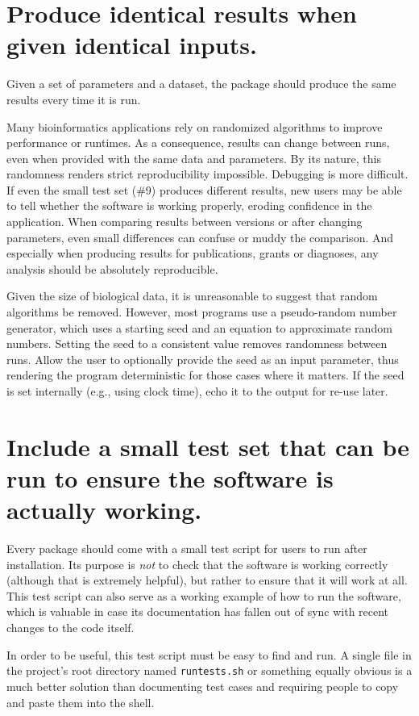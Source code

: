 \documentclass[10pt]{article}
\begin{document}
\section{Produce identical results when given identical inputs.}

Given a set of parameters and a dataset, the package should produce the
same results every time it is run.

Many bioinformatics applications rely on randomized algorithms to
improve performance or runtimes. As a consequence, results can change
between runs, even when provided with the same data and parameters. By
its nature, this randomness renders strict reproducibility impossible.
Debugging is more difficult. If even the small test set (\#9) produces
different results, new users may be able to tell whether the software is
working properly, eroding confidence in the application. When comparing
results between versions or after changing parameters, even small
differences can confuse or muddy the comparison. And especially when
producing results for publications, grants or diagnoses, any analysis
should be absolutely reproducible.

Given the size of biological data, it is unreasonable to suggest that
random algorithms be removed. However, most programs use a pseudo-random
number generator, which uses a starting seed and an equation to
approximate random numbers. Setting the seed to a consistent value
removes randomness between runs. Allow the user to optionally provide
the seed as an input parameter, thus rendering the program deterministic
for those cases where it matters. If the seed is set internally (e.g.,
using clock time), echo it to the output for re-use later.

\section{Include a small test set that can be run to ensure the software is actually working.}

Every package should come with a small test script for users to run
after installation. Its purpose is \emph{not} to check that the software
is working correctly (although that is extremely helpful), but rather to
ensure that it will work at all. This test script can also serve as a
working example of how to run the software, which is valuable in case
its documentation has fallen out of sync with recent changes to the code
itself.

In order to be useful, this test script must be easy to find and run. A
single file in the project's root directory named \texttt{runtests.sh}
or something equally obvious is a much better solution than documenting
test cases and requiring people to copy and paste them into the shell.
\end{document}
